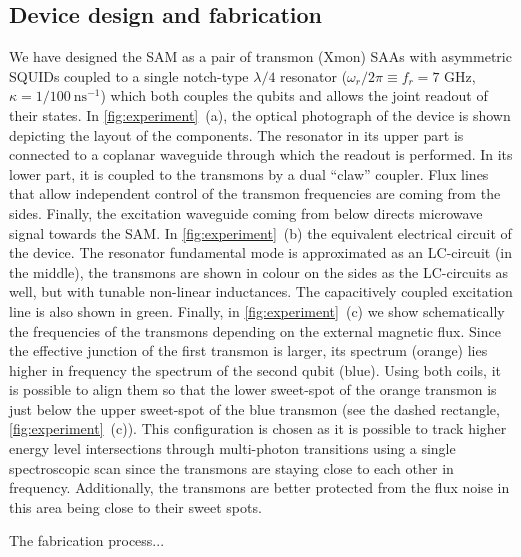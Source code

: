\documentclass[%
 aip,
 amsmath,amssymb,
 reprint,%
]{revtex4-1}
\begin{document}
\subsection{Device design and fabrication}
We have designed the SAM as a pair of transmon (Xmon\cite{barends2013coherent}) SAAs with asymmetric SQUIDs\cite{hutchings2017tunable} coupled to a single notch-type\cite{probst2015efficient} $\lambda/4$ resonator ($\omega_r/2\pi \equiv f_r = 7$ GHz, $\kappa = 1/100\ \text{ns}^{-1}$) which both couples\cite{majer2007coupling} the qubits and allows the joint\cite{chow2010detecting} readout of their states. In \autoref{fig:experiment}~(a), the optical photograph of the device is shown depicting the layout of the components. The resonator in its upper part is connected to a coplanar waveguide through which the readout is performed. In its lower part, it is coupled to the transmons by a dual ``claw''\cite{barends2013coherent} coupler. Flux lines that allow independent control of the transmon frequencies are coming from the sides. Finally, the excitation waveguide coming from below directs microwave signal towards the SAM. In \autoref{fig:experiment}~(b) the equivalent electrical circuit of the device. The resonator fundamental mode is approximated as an LC-circuit (in the middle), the transmons are shown in colour on the sides as the LC-circuits as well, but with tunable non-linear inductances. The capacitively coupled excitation line is also shown in green. Finally, in \autoref{fig:experiment}~(c) we show schematically the frequencies of the transmons depending on the external magnetic flux. Since the effective junction of the first transmon is larger, its spectrum (orange) lies higher in frequency the spectrum of the second qubit (blue). Using both coils, it is possible to align them so that the lower sweet-spot of the orange transmon is just below the upper sweet-spot of the blue transmon (see the dashed rectangle,  \autoref{fig:experiment}~(c)). This configuration is chosen as it is possible to track higher energy level intersections through multi-photon transitions using a single spectroscopic scan since the transmons are staying close to each other in frequency. Additionally, the transmons are better protected from the flux noise in this area being close to their sweet spots.

The fabrication process...
\end{document}
